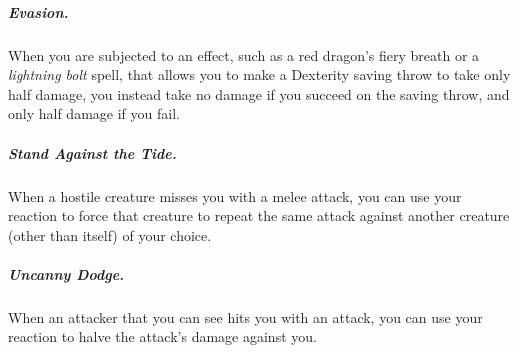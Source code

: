 \subparagraph*{Evasion.} When you are subjected to an effect, such as a red dragon's fiery breath or a \textit{lightning bolt} spell, that allows you to make a Dexterity saving throw to take only half damage, you instead take no damage if you succeed on the saving throw, and only half damage if you fail.

\subparagraph*{Stand Against the Tide.} When a hostile creature misses you with a melee attack, you can use your reaction to force that creature to repeat the same attack against another creature (other than itself) of your choice.

\subparagraph*{Uncanny Dodge.} When an attacker that you can see hits you with an attack, you can use your reaction to halve the attack's damage against you.